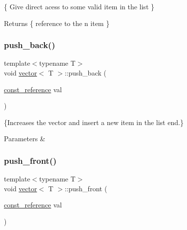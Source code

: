 \{ Give direct acess to some valid item in the list \} 

\begin{DoxyReturn}{Returns}
\{ reference to the n item \} 
\end{DoxyReturn}
\mbox{\label{classvector_a682f781951d464b9066fa0102d42533a}} 
\subsubsection{\texorpdfstring{push\+\_\+back()}{push\_back()}}
{\footnotesize\ttfamily template$<$typename T$>$ \\
void \hyperlink{classvector}{vector}$<$ T $>$\+::push\+\_\+back (\begin{DoxyParamCaption}\item[{\hyperlink{classvector_aad263433b4072dfbc26ace0df6441960}{const\+\_\+reference}}]{val }\end{DoxyParamCaption})\hspace{0.3cm}{\ttfamily [inline]}}



\{Increases the vector and insert a new item in the list end.\} 


\begin{DoxyParams}{Parameters}
{\em } & \\
\hline
\end{DoxyParams}
\mbox{\label{classvector_a1dab5eb5f1247cadc4caf77386b61010}} 
\subsubsection{\texorpdfstring{push\+\_\+front()}{push\_front()}}
{\footnotesize\ttfamily template$<$typename T$>$ \\
void \hyperlink{classvector}{vector}$<$ T $>$\+::push\+\_\+front (\begin{DoxyParamCaption}\item[{\hyperlink{classvector_aad263433b4072dfbc26ace0df6441960}{const\+\_\+reference}}]{val }\end{DoxyParamCaption})\hspace{0.3cm}{\ttfamily [inline]}}



